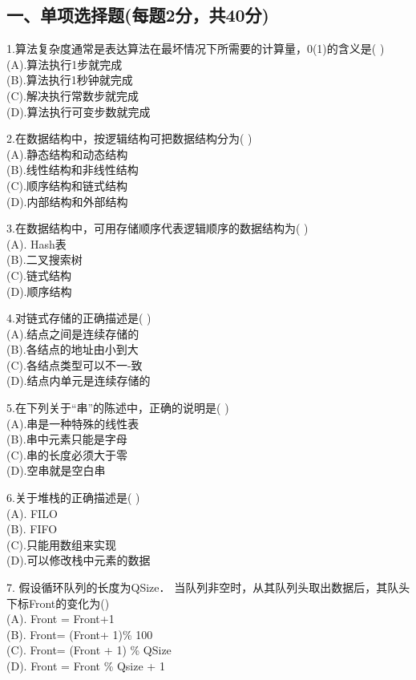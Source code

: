 

\subsection{一、单项选择题(每题2分，共40分)}

1.算法复杂度通常是表达算法在最坏情况下所需要的计算量，0(1)的含义是( ) \\
(A).算法执行1步就完成 \\
(B).算法执行1秒钟就完成 \\
(C).解决执行常数步就完成 \\
(D).算法执行可变步数就完成

2.在数据结构中，按逻辑结构可把数据结构分为( ) \\
(A).静态结构和动态结构 \\
(B).线性结构和非线性结构 \\
(C).顺序结构和链式结构 \\
(D).内部结构和外部结构

3.在数据结构中，可用存储顺序代表逻辑顺序的数据结构为( ) \\
(A). Hash表 \\
(B).二叉搜索树 \\
(C).链式结构 \\
(D).顺序结构

4.对链式存储的正确描述是( ) \\
(A).结点之间是连续存储的 \\
(B).各结点的地址由小到大 \\
(C).各结点类型可以不一-致 \\
(D).结点内单元是连续存储的

5.在下列关于“串”的陈述中，正确的说明是( ) \\
(A).串是一种特殊的线性表 \\
(B).串中元素只能是字母 \\
(C).串的长度必须大于零 \\
(D).空串就是空白串

6.关于堆栈的正确描述是( ) \\
(A). FILO \\
(B). FIFO \\
(C).只能用数组来实现 \\
(D).可以修改栈中元素的数据

7. 假设循环队列的长度为QSize． 当队列非空时，从其队列头取出数据后，其队头下标Front的变化为() \\
(A). Front = Front+1 \\
(B). Front= (Front+ 1)\% 100 \\
(C). Front= (Front + 1) \% QSize \\
(D). Front = Front \% Qsize + 1

